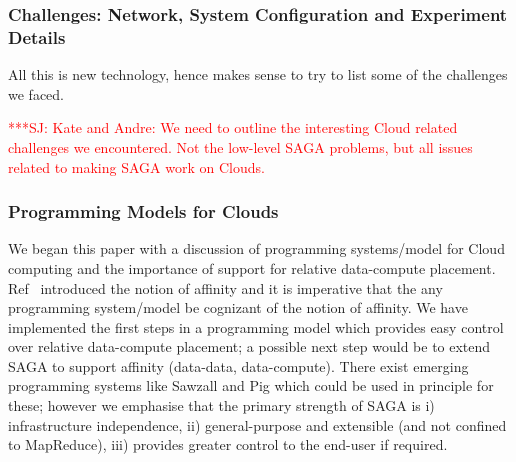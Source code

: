 \documentclass[conference,final]{IEEEtran}
\newcommand{\jhanote}[1]{ {\textcolor{red} { ***SJ: #1 }}}
\newcommand{\jhanote}[1]{}
\newcommand{\sagamapreduce }{SAGA-MapReduce }
\begin{document}



\subsubsection*{Challenges: Network, System Configuration and
  Experiment Details}

All this is new technology, hence makes sense to try to list some of
the challenges we faced. 

\jhanote{Kate and Andre: We need to outline the interesting Cloud
related challenges we encountered.  Not the low-level SAGA problems,
but all issues related to making SAGA work on Clouds.  
}


\subsubsection*{Programming Models for Clouds}


We began this paper with a discussion of programming systems/model for
Cloud computing and the importance of support for relative
data-compute placement. Ref~\cite{jha_ccpe09} introduced the notion of
affinity and it is imperative that the any programming system/model be
cognizant of the notion of affinity. We have implemented the first
steps in a programming model which provides easy control over relative
data-compute placement; a possible next step would be to extend SAGA
to support affinity (data-data, data-compute).  There exist emerging
programming systems like Sawzall and Pig which could be used in
principle for these; however we emphasise that the primary strength of
SAGA is i) infrastructure independence, ii) general-purpose and
extensible (and not confined to MapReduce), iii) provides greater
control to the end-user if required.
\end{document}
